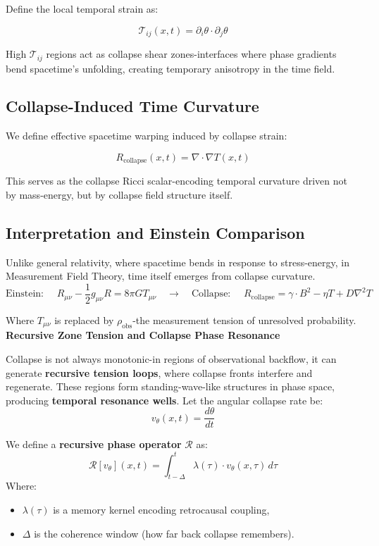 Define the local temporal strain as:

\[
\mathcal{T}_{ij}(x, t) = \partial_i \theta \cdot \partial_j \theta
\]

High $\mathcal{T}_{ij}$ regions act as collapse shear zones-interfaces where phase gradients bend spacetime's unfolding, creating temporary anisotropy in the time field. \cite{chapter_time} \subsection*{Collapse-Induced Time Curvature}

We define effective spacetime warping induced by collapse strain:

\[
R_{\text{collapse}}(x, t) = \nabla \cdot \nabla T(x, t)
\]

This serves as the collapse Ricci scalar-encoding temporal curvature driven not by mass-energy, but by collapse field structure itself. \cite{chapter_time} \subsection*{Interpretation and Einstein Comparison}

Unlike general relativity, where spacetime bends in response to stress-energy, in Measurement Field Theory, time itself emerges from collapse curvature. \cite{chapter_time} \[
\boxed{
\text{Einstein: } \quad R_{\mu\nu} - \frac{1}{2}g_{\mu\nu}R = 8\pi G T_{\mu\nu}
}
\quad \longrightarrow \quad
\boxed{
\text{Collapse: } \quad R_{\text{collapse}} = \gamma \cdot B^2 - \eta T + D \nabla^2 T
}
\]

Where $T_{\mu\nu}$ is replaced by $\rho_{\text{obs}}$-the measurement tension of unresolved probability. \cite{chapter_time} \newpage
  \textbf{Recursive Zone Tension and Collapse Phase Resonance}
  
  Collapse is not always monotonic-in regions of observational backflow, it can generate \textbf{recursive tension loops}, where collapse fronts interfere and regenerate. \cite{chapter_time} These regions form standing-wave-like structures in phase space, producing \textbf{temporal resonance wells}. Let the angular collapse rate be:
  \[
  v_\theta(x, t) = \frac{d\theta}{dt}
  \]
  
  We define a \textbf{recursive phase operator} $\mathcal{R}$ as:
  \[
  \mathcal{R}[v_\theta](x, t) = \int_{t-\Delta}^{t} \lambda(\tau) \cdot v_\theta(x, \tau) \, d\tau
  \]
  Where:
  \begin{itemize}
    \item $\lambda(\tau)$ is a memory kernel encoding retrocausal coupling,
    \item $\Delta$ is the coherence window (how far back collapse remembers). \cite{chapter_time} \end{itemize}
  
